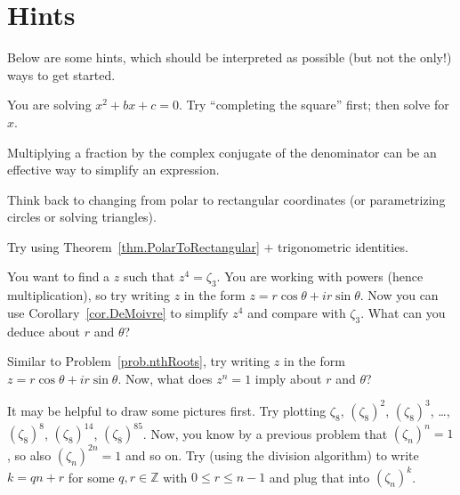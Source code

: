 \chapter{Hints}
\label{chapter:Hints}
\thispagestyle{empty}

Below are some hints, which should be interpreted as possible (but not the only!) ways to get started.

\begin{hint*}
You are solving $x^2+bx+c = 0$. Try ``completing the square'' first; then solve for $x$.
\end{hint*}

\begin{hint*}
Multiplying a fraction by the complex conjugate of the denominator can be an effective way to simplify an expression.
\end{hint*}

\begin{hint*}
Think back to changing from polar to rectangular coordinates (or parametrizing circles or solving triangles).
\end{hint*}

\begin{hint*}
Try using Theorem~\ref{thm.PolarToRectangular} $+$ trigonometric identities. 
\end{hint*}

\begin{hint*}
You want to find a $z$ such that $z^4 = \zeta_3$. You are working with powers (hence multiplication), so try writing $z$ in the form $z = r\cos\theta + ir\sin\theta$. Now you can use Corollary~\ref{cor.DeMoivre} to simplify $z^4$ and compare with $\zeta_3$. What can you deduce about $r$ and $\theta$?
\end{hint*}

\begin{hint*}
Similar to Problem~\ref{prob.nthRoots}, try writing $z$ in the form $z = r\cos\theta + ir\sin\theta$. Now, what does $z^n = 1$ imply about $r$ and $\theta$?
\end{hint*}

\begin{hint*}
It may be helpful to draw some pictures first. Try plotting $\zeta_8$, $(\zeta_8)^2$, $(\zeta_8)^3$, \ldots, $(\zeta_8)^8$, $(\zeta_8)^{14}$, $(\zeta_8)^{85}$. Now, you know by a previous problem that $(\zeta_n)^n = 1$, so also $(\zeta_n)^{2n} = 1$ and so on. Try (using the division algorithm) to write $k = qn +r$ for some $q,r\in \mathbb{Z}$ with $0\le r \le n-1$ and plug that into $(\zeta_n)^{k}$.
\end{hint*}


